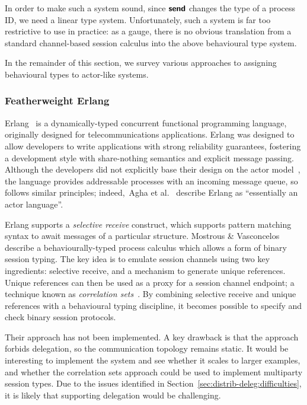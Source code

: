 \documentclass[
graybox,
envcountchap
]{svmult}
\begin{document}
\begin{bibunit}
  In order to make such a system sound, since $\textbf{\textsf{send}}$ changes the type
  of a process ID, we need a linear type system. Unfortunately, such a system is
  far too restrictive to use in practice: as a gauge, there is no obvious
  translation from a standard channel-based session calculus into the above
  behavioural type system.

  In the remainder of this section, we survey various approaches to assigning
  behavioural types to actor-like systems.

  \subsubsection{Featherweight Erlang}
  Erlang~\cite{Armstrong10:erlang} is a dynamically-typed concurrent functional
  programming language, originally designed for telecommunications applications.
  Erlang was designed to allow developers to write applications with strong
  reliability guarantees, fostering a development style with share-nothing
  semantics and explicit message passing.
  Although the developers did not
  explicitly base their design on the actor model~\cite{erlang-not-actor}, the
  language provides addressable processes with an incoming message queue, so
  follows similar principles; indeed,~Agha et
  al.~\cite{AghaMST97:foundation-actor} describe Erlang as ``essentially
  an actor language''.

  Erlang supports a \emph{selective receive} construct, which supports pattern
  matching syntax to await messages of a particular structure.
  Mostrous \& Vasconcelos~\cite{MostrousV11:session-erlang} describe a
  behaviourally-typed process calculus which allows a form of binary session
  typing. The key idea is to emulate session channels using two key ingredients:
  selective receive, and a mechanism to generate unique references. Unique
  references can then be used as a proxy for a session channel endpoint; a
  technique known as \emph{correlation sets}~\cite{Viroli04a:correlation}. By
  combining selective receive and unique references with a behavioural typing
  discipline, it becomes possible to specify and check binary session protocols.

  Their approach has not been implemented. A key drawback is that the approach
  forbids delegation, so the communication topology remains static. It would be
  interesting to implement the system and see whether it scales to larger
  examples, and whether the correlation sets approach could be used to implement
  multiparty session types. Due to the issues identified in
  Section~\ref{sec:distrib-deleg:difficulties}, it is likely that supporting
  delegation would be challenging.


\end{bibunit}
\end{document}
